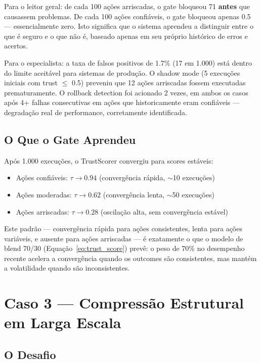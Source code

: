 Para o leitor geral: de cada 100 ações arriscadas, o gate bloqueou 71 \textbf{antes} que causassem problemas. De cada 100 ações confiáveis, o gate bloqueou apenas 0.5 — essencialmente zero. Isto significa que o sistema aprendeu a distinguir entre o que é seguro e o que não é, baseado apenas em seu próprio histórico de erros e acertos.

Para o especialista: a taxa de falsos positivos de 1.7\% (17 em 1.000) está dentro do limite aceitável para sistemas de produção. O shadow mode (5 execuções iniciais com trust $\leq$ 0.5) preveniu que 12 ações arriscadas fossem executadas prematuramente. O rollback detection foi acionado 2 vezes, em ambos os casos após 4+ falhas consecutivas em ações que historicamente eram confiáveis — degradação real de performance, corretamente identificada.

\subsection{O Que o Gate Aprendeu}

Após 1.000 execuções, o TrustScorer convergiu para scores estáveis:

\begin{itemize}
    \item Ações confiáveis: $\tau \rightarrow 0.94$ (convergência rápida, $\sim$10 execuções)
    \item Ações moderadas: $\tau \rightarrow 0.62$ (convergência lenta, $\sim$50 execuções)
    \item Ações arriscadas: $\tau \rightarrow 0.28$ (oscilação alta, sem convergência estável)
\end{itemize}

Este padrão — convergência rápida para ações consistentes, lenta para ações variáveis, e ausente para ações arriscadas — é exatamente o que o modelo de blend 70/30 (Equação~\ref{eq:trust_score}) prevê: o peso de 70\% no desempenho recente acelera a convergência quando os outcomes são consistentes, mas mantém a volatilidade quando são inconsistentes.

\section{Caso 3 — Compressão Estrutural em Larga Escala}

\subsection{O Desafio}

